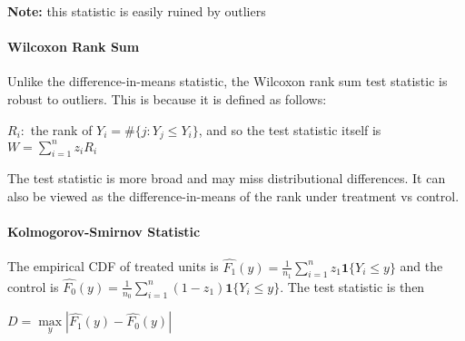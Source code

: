 \documentclass[11pt]{elegantbook}
\begin{document}
\textbf{Note:} this statistic is easily ruined by outliers

\paragraph{Wilcoxon Rank Sum}
    Unlike the difference-in-means statistic, the Wilcoxon rank sum test statistic is robust to outliers. This is because it is defined as follows: 
    \begin{center} 
    $R_i:$ the rank of $Y_i = \#\{j: Y_j \leq Y_i\}$, and so the test statistic itself is  $W=\sum_{i=1}^{n}z_iR_i$ 
    \end{center}
    The test statistic is more broad and may miss distributional differences. It can also be viewed as the difference-in-means of the rank under treatment vs control. 

\paragraph{Kolmogorov-Smirnov Statistic}
   The empirical CDF of treated units is $\hat{F_1}(y) = \frac{1}{n_1}\sum_{i=1}^n z_1 \mathbf{1}\{Y_i \leq y\}$  and the control is $\hat{F_0}(y) = \frac{1}{n_0}\sum_{i=1}^n (1-z_1) \mathbf{1}\{Y_i \leq y\}$. The test statistic is then
   \begin{center} $D=\underset{y}{\max}|\hat{F_1}(y) - \hat{F_0}(y)|$ \end{center}




\end{document}

